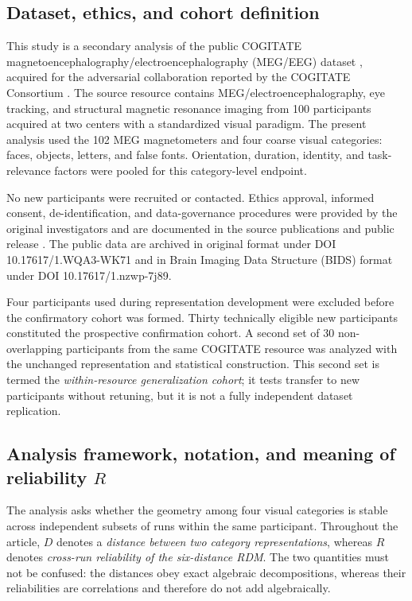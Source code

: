 \documentclass[11pt]{article}
\begin{document}
\subsection{Dataset, ethics, and cohort definition}
This study is a secondary analysis of the public COGITATE magnetoencephalography/electroencephalography (MEG/EEG) dataset \citep{Liu2026}, acquired for the adversarial collaboration reported by the COGITATE Consortium \citep{Cogitate2025}. The source resource contains MEG/electroencephalography, eye tracking, and structural magnetic resonance imaging from 100 participants acquired at two centers with a standardized visual paradigm. The present analysis used the 102 MEG magnetometers and four coarse visual categories: faces, objects, letters, and false fonts. Orientation, duration, identity, and task-relevance factors were pooled for this category-level endpoint.

No new participants were recruited or contacted. Ethics approval, informed consent, de-identification, and data-governance procedures were provided by the original investigators and are documented in the source publications and public release \citep{Cogitate2025,Liu2026}. The public data are archived in original format under DOI 10.17617/1.WQA3-WK71 and in Brain Imaging Data Structure (BIDS) format under DOI 10.17617/1.nzwp-7j89.

Four participants used during representation development were excluded before the confirmatory cohort was formed. Thirty technically eligible new participants constituted the prospective confirmation cohort. A second set of 30 non-overlapping participants from the same COGITATE resource was analyzed with the unchanged representation and statistical construction. This second set is termed the \emph{within-resource generalization cohort}; it tests transfer to new participants without retuning, but it is not a fully independent dataset replication.

\subsection{Analysis framework, notation, and meaning of reliability $R$}
The analysis asks whether the geometry among four visual categories is stable across independent subsets of runs within the same participant. Throughout the article, $D$ denotes a \emph{distance between two category representations}, whereas $R$ denotes \emph{cross-run reliability of the six-distance RDM}. The two quantities must not be confused: the distances obey exact algebraic decompositions, whereas their reliabilities are correlations and therefore do not add algebraically.
\end{document}
